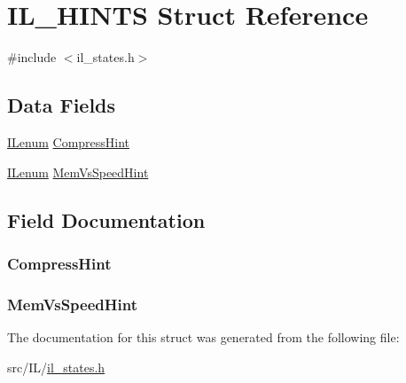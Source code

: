 \hypertarget{struct_i_l___h_i_n_t_s}{\section{I\-L\-\_\-\-H\-I\-N\-T\-S Struct Reference}
\label{struct_i_l___h_i_n_t_s}
}


{\ttfamily \#include $<$il\-\_\-states.\-h$>$}

\subsection*{Data Fields}
\begin{DoxyCompactItemize}
\item 
\hyperlink{il_8h_a1542f3a70c0c5370a30a1fa5ce349e2d}{I\-Lenum} \hyperlink{struct_i_l___h_i_n_t_s_aa6c1b813780d6ccef5bacc68c7911777}{Compress\-Hint}
\item 
\hyperlink{il_8h_a1542f3a70c0c5370a30a1fa5ce349e2d}{I\-Lenum} \hyperlink{struct_i_l___h_i_n_t_s_aa3c5fb9aaa55c6bd0afaca19c7a919a0}{Mem\-Vs\-Speed\-Hint}
\end{DoxyCompactItemize}


\subsection{Field Documentation}
\hypertarget{struct_i_l___h_i_n_t_s_aa6c1b813780d6ccef5bacc68c7911777}{
\subsubsection[{Compress\-Hint}]{ Compress\-Hint}}\label{struct_i_l___h_i_n_t_s_aa6c1b813780d6ccef5bacc68c7911777}
\hypertarget{struct_i_l___h_i_n_t_s_aa3c5fb9aaa55c6bd0afaca19c7a919a0}{
\subsubsection[{Mem\-Vs\-Speed\-Hint}]{ Mem\-Vs\-Speed\-Hint}}\label{struct_i_l___h_i_n_t_s_aa3c5fb9aaa55c6bd0afaca19c7a919a0}


The documentation for this struct was generated from the following file\-:\begin{DoxyCompactItemize}
\item 
src/\-I\-L/\hyperlink{il__states_8h}{il\-\_\-states.\-h}\end{DoxyCompactItemize}
